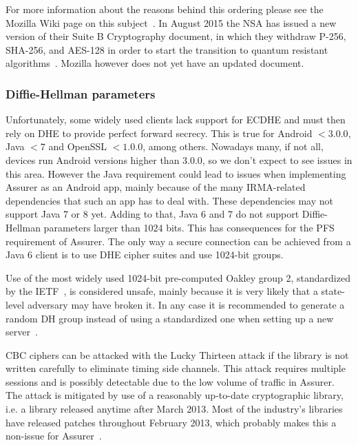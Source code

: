 For more information about the reasons behind this ordering please see the Mozilla Wiki page on this subject~\cite{mozilla}. In August 2015 the NSA has issued a new version of their Suite B Cryptography document, in which they withdraw P-256, SHA-256, and AES-128 in order to start the transition to quantum resistant algorithms~\cite{nsacrypto}. Mozilla however does not yet have an updated document.

\subsubsection{Diffie-Hellman parameters}
Unfortunately, some widely used clients lack support for ECDHE and must then rely on DHE to provide perfect forward secrecy. This is true for Android $< 3.0.0$, Java $< 7$ and OpenSSL $< 1.0.0$, among others. Nowadays many, if not all, devices run Android versions higher than 3.0.0, so we don't expect to see issues in this area. However the Java requirement could lead to issues when implementing Assurer as an Android app, mainly because of the many IRMA-related dependencies that such an app has to deal with. These dependencies may not support Java 7 or 8 yet. Adding to that, Java 6 and 7 do not support Diffie-Hellman parameters larger than 1024 bits. This has consequences for the PFS requirement of Assurer. The only way a secure connection can be achieved from a Java 6 client is to use DHE cipher suites and use 1024-bit groups.

Use of the most widely used 1024-bit pre-computed Oakley group 2, standardized by the IETF~\cite{ike}, is considered unsafe, mainly because it is very likely that a state-level adversary may have broken it. In any case it is recommended to generate a random DH group instead of using a standardized one when setting up a new server~\cite{logjam}.

CBC ciphers can be attacked with the Lucky Thirteen attack if the library is not written carefully to eliminate timing side channels. This attack requires multiple sessions and is possibly detectable due to the low volume of traffic in Assurer. The attack is mitigated by use of a reasonably up-to-date cryptographic library, i.e. a library released anytime after March 2013. Most of the industry's libraries have released patches throughout February 2013, which probably makes this a non-issue for Assurer~\cite{lucky13}.

